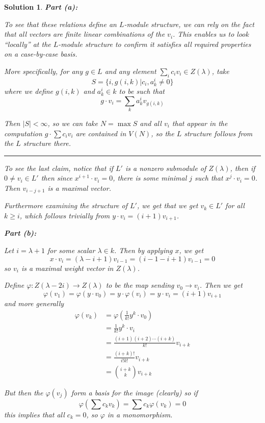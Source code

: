 \documentclass[12pt]{article}
\theoremstyle{nonumberbreak}
\newtheorem{sol}{Solution}
\theoremstyle{changebreak}
\theoremstyle{nonumberbreak}
\theoremstyle{change}
\newcommand*{\brk}{
\rule{2in}{.1pt}
}
\begin{document}
\begin{sol}
	\textbf{Part (a):}
	
	To see that these relations define an $L$-module structure, we can rely on the fact that all vectors are
	\textit{finite} linear combinations of the $v_i$. This enables us to look ``locally'' at the $L$-module structure to confirm it 
	satisfies all required properties on a case-by-case basis.

	More specifically, for any $g\in L$ and any element $\sum_i c_i v_i\in Z(\lambda)$, take 
	\[S=\{i,g(i,k)|c_i,a^i_k\ne 0\}\] 
	where we define $g(i, k)$ and $a^i_k\in k$ to be such that 
	\[g\cdot v_i=\sum_k a^i_k v_{g(i,k)}\]

	Then $|S|<\infty$, so we can take $N=\max S$ and all $v_i$ that appear in the computation $g\cdot \sum c_i v_i$ are contained in 
	$V(N)$, so the $L$ structure follows from the $L$ structure there.

	\brk

	To see the last claim, notice that if $L'$ is a nonzero submodule of $Z(\lambda)$, then if $0\ne v_i\in L'$ then 
	since $x^{i+1}\cdot v_i=0$, there is some minimal $j$ such that $x^{j}\cdot v_i=0$. Then $v_{i-j+1}$ is a maximal
	vector.

	Furthermore examining the structure of $L'$, we get that we get $v_k\in L'$ for all $k\ge i$, which follows
	trivially from $y\cdot v_i=(i+1)v_{i+1}$.

	\textbf{Part (b):}

	Let $i=\lambda+1$ for some scalar $\lambda\in k$. Then by applying $x$, we get
	\[x\cdot v_i=(\lambda-i+1)v_{i-1}=(i-1-i+1)v_{i-1}=0\]
	so $v_i$ is a maximal weight vector in $Z(\lambda)$.

	Define $\varphi:Z(\lambda-2i)\to Z(\lambda)$ to be the map sending $v_0\to v_i$. Then we get
	\[\varphi(v_{1})=\varphi\left(y\cdot v_0\right)=y\cdot\varphi(v_i)=y\cdot v_i=(i+1)v_{i+1}\]
	and more generally 
	\begin{align*}
		\varphi(v_k)&=\varphi\left(\frac{1}{k!}y^k\cdot v_0\right)\\
		&=\frac{1}{k!}y^k\cdot v_i\\
		&=\frac{(i+1)(i+2)\cdots (i+k)}{k!} v_{i+k}\\
		&=\frac{(i+k)!}{i!k!}v_{i+k}\\
		&=\binom{i+k}{k}v_{i+k}
	\end{align*}

	But then the $\varphi(v_j)$ form a basis for the image (clearly) so if 
	\[\varphi\left(\sum c_k v_k\right)=\sum c_k\varphi(v_k)=0\]
	this implies that all $c_k=0$, so $\varphi$ in a monomorphism.


\end{sol}
\end{document}
